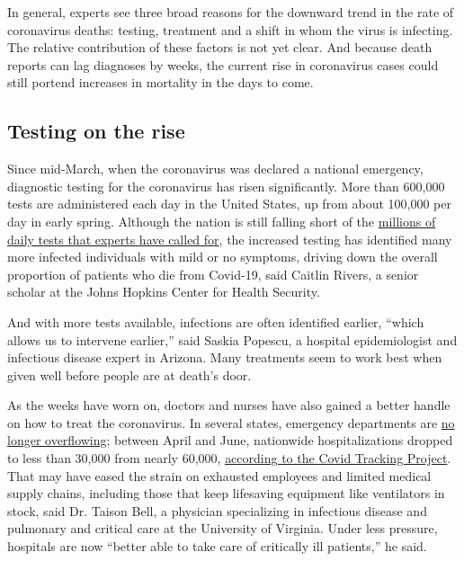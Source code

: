 In general, experts see three broad reasons for the downward trend in
the rate of coronavirus deaths: testing, treatment and a shift in whom
the virus is infecting. The relative contribution of these factors is
not yet clear. And because death reports can lag diagnoses by weeks, the
current rise in coronavirus cases could still portend increases in
mortality in the days to come.

\hypertarget{testing-on-the-rise}{%
\subsection{Testing on the rise}\label{testing-on-the-rise}}

Since mid-March, when the coronavirus was declared a national emergency,
diagnostic testing for the coronavirus has risen significantly. More
than 600,000 tests are administered each day in the United States, up
from about 100,000 per day in early spring. Although the nation is still
falling short of the
\href{https://www.kff.org/coronavirus-policy-watch/what-testing-capacity-do-we-need/}{millions
of daily tests that experts have called for}, the increased testing has
identified many more infected individuals with mild or no symptoms,
driving down the overall proportion of patients who die from Covid-19,
said Caitlin Rivers, a senior scholar at the Johns Hopkins Center for
Health Security.

And with more tests available, infections are often identified earlier,
``which allows us to intervene earlier,'' said Saskia Popescu, a
hospital epidemiologist and infectious disease expert in Arizona. Many
treatments seem to work best when given well before people are at
death's door.

As the weeks have worn on, doctors and nurses have also gained a better
handle on how to treat the coronavirus. In several states, emergency
departments are \href{https://covidtracking.com/data}{no longer
overflowing}; between April and June, nationwide hospitalizations
dropped to less than 30,000 from nearly 60,000,
\href{https://covidtracking.com/data/us-daily}{according to the Covid
Tracking Project}. That may have eased the strain on exhausted employees
and limited medical supply chains, including those that keep lifesaving
equipment like ventilators in stock, said Dr. Taison Bell, a physician
specializing in infectious disease and pulmonary and critical care at
the University of Virginia. Under less pressure, hospitals are now
``better able to take care of critically ill patients,'' he said.

